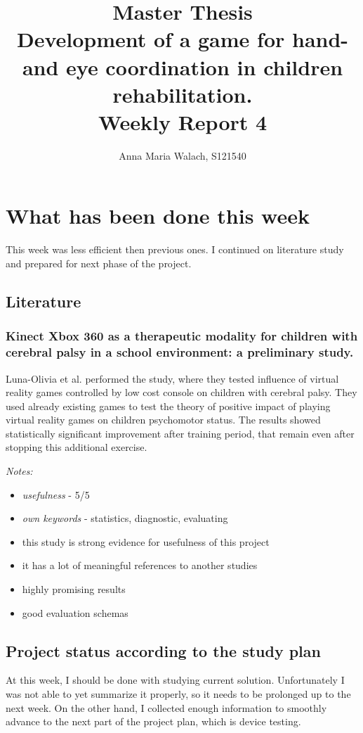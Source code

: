 \documentclass[10pt,a4paper]{article}
\title{{Master Thesis\\[0.5em]}
       {\bf \huge Development of a game for hand- and eye coordination in children rehabilitation.\\[0.5em]}
       {\bf Weekly Report 4}}
\author{Anna Maria Walach, S121540}
\begin{document}
\maketitle

\section*{What has been done this week}
This week was less efficient then previous ones. I continued on literature study and prepared for next phase of the project.

\subsection*{Literature}
\subsubsection*{Kinect Xbox 360 as a therapeutic modality for children with cerebral palsy in a school environment: a preliminary study.}

Luna-Olivia et al. \cite{game_xbox_360} performed the study, where they tested influence of virtual reality games controlled by low cost console on children with cerebral palsy. They used already existing games to test the theory of positive impact of playing virtual reality games on children psychomotor status. The results showed statistically significant improvement after training period, that remain even after stopping this additional exercise. 

\emph{Notes:}
\begin{itemize}
\item \emph{usefulness} - 5/5
\item \emph{own keywords} - statistics, diagnostic, evaluating 
\item this study is strong evidence for usefulness of this project
\item it has a lot of meaningful references to another studies
\item highly promising results
\item good evaluation schemas
\end{itemize}

\subsection*{Project status according to the study plan}
At this week, I should be done with studying current solution. Unfortunately I was not able to yet summarize it properly, so it needs to be prolonged up to the next week. On the other hand, I collected enough information to smoothly advance to the next part of the project plan, which is device testing. 
\end{document}
